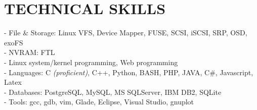 \section{TECHNICAL SKILLS}
\vspace{0.07in}
- File \& Storage: Linux VFS, Device Mapper, FUSE, SCSI, iSCSI, SRP, OSD,
exoFS
\vspace{0.02in}\\
- NVRAM: FTL
\vspace{0.02in}\\
- Linux system/kernel programming, Web programming
\vspace{0.02in}\\
- Languages: C {\footnotesize \it (proficient)}, C++, Python, BASH, PHP, JAVA, C\#,
	Javascript, Latex
\vspace{0.02in}\\
- Databases: PostgreSQL, MySQL, MS SQLServer, IBM DB2, SQLite
\vspace{0.02in}\\
- Tools: gcc, gdb, vim, Glade, Eclipse, Visual Studio, gnuplot

